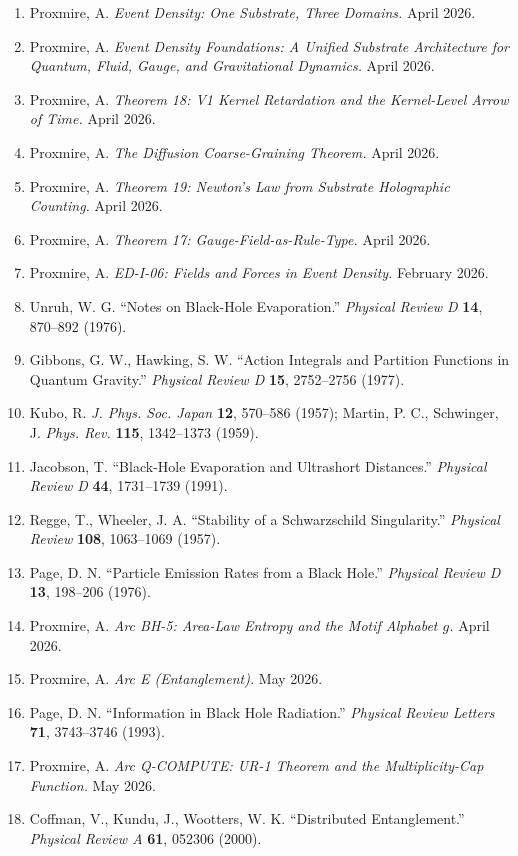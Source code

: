 \documentclass[11pt,a4paper]{article}
\begin{document}
\begin{enumerate}[leftmargin=*,itemsep=2pt]
  \item Proxmire, A. \emph{Event Density: One Substrate, Three Domains.} April 2026.
  \item Proxmire, A. \emph{Event Density Foundations: A Unified Substrate Architecture for Quantum, Fluid, Gauge, and Gravitational Dynamics.} April 2026.
  \item Proxmire, A. \emph{Theorem 18: V1 Kernel Retardation and the Kernel-Level Arrow of Time.} April 2026.
  \item Proxmire, A. \emph{The Diffusion Coarse-Graining Theorem.} April 2026.
  \item Proxmire, A. \emph{Theorem 19: Newton's Law from Substrate Holographic Counting.} April 2026.
  \item Proxmire, A. \emph{Theorem 17: Gauge-Field-as-Rule-Type.} April 2026.
  \item Proxmire, A. \emph{ED-I-06: Fields and Forces in Event Density.} February 2026.
  \item Unruh, W. G. ``Notes on Black-Hole Evaporation.'' \emph{Physical Review D} \textbf{14}, 870--892 (1976).
  \item Gibbons, G. W., Hawking, S. W. ``Action Integrals and Partition Functions in Quantum Gravity.'' \emph{Physical Review D} \textbf{15}, 2752--2756 (1977).
  \item Kubo, R. \emph{J. Phys. Soc. Japan} \textbf{12}, 570--586 (1957); Martin, P. C., Schwinger, J. \emph{Phys. Rev.} \textbf{115}, 1342--1373 (1959).
  \item Jacobson, T. ``Black-Hole Evaporation and Ultrashort Distances.'' \emph{Physical Review D} \textbf{44}, 1731--1739 (1991).
  \item Regge, T., Wheeler, J. A. ``Stability of a Schwarzschild Singularity.'' \emph{Physical Review} \textbf{108}, 1063--1069 (1957).
  \item Page, D. N. ``Particle Emission Rates from a Black Hole.'' \emph{Physical Review D} \textbf{13}, 198--206 (1976).
  \item Proxmire, A. \emph{Arc BH-5: Area-Law Entropy and the Motif Alphabet $g$.} April 2026.
  \item Proxmire, A. \emph{Arc E (Entanglement).} May 2026.
  \item Page, D. N. ``Information in Black Hole Radiation.'' \emph{Physical Review Letters} \textbf{71}, 3743--3746 (1993).
  \item Proxmire, A. \emph{Arc Q-COMPUTE: UR-1 Theorem and the Multiplicity-Cap Function.} May 2026.
  \item Coffman, V., Kundu, J., Wootters, W. K. ``Distributed Entanglement.'' \emph{Physical Review A} \textbf{61}, 052306 (2000).

\end{enumerate}
\end{document}
